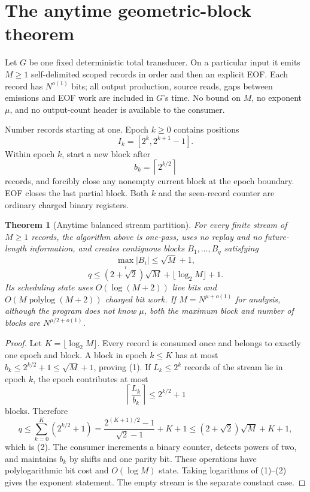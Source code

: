 \documentclass[11pt]{article}
\newtheorem{theorem}{Theorem}
\begin{document}
\section{The anytime geometric-block theorem}
Let $G$ be one fixed deterministic total transducer.  On a particular input it
emits $M\ge1$ self-delimited scoped records in order and then an explicit EOF.
Each record has $N^{o(1)}$ bits; all output production, source reads, gaps
between emissions and EOF work are included in $G$'s time.  No bound on $M$,
no exponent $\mu$, and no output-count header is available to the consumer.

Number records starting at one.  Epoch $k\ge0$ contains positions
\[
I_k=[2^k,2^{k+1}-1].
\]
Within epoch $k$, start a new block after
\[
b_k=\left\lceil2^{k/2}\right\rceil
\]
records, and forcibly close any nonempty current block at the epoch boundary.
EOF closes the last partial block.  Both $k$ and the seen-record counter are
ordinary charged binary registers.

\begin{theorem}[Anytime balanced stream partition]\label{th:anytime}
For every finite stream of $M\ge1$ records, the algorithm above is one-pass,
uses no replay and no future-length information, and creates contiguous blocks
$B_1,\ldots,B_q$ satisfying
\[
\boxed{\max_i|B_i|\le\sqrt M+1},                            \tag{1}
\]
\[
\boxed{q\le(2+\sqrt2)\sqrt M+\lfloor\log_2M\rfloor+1}.     \tag{2}
\]
Its scheduling state uses $O(\log(M+2))$ live bits and
$O(M\operatorname{polylog}(M+2))$ charged bit work.  If
$M=N^{\mu+o(1)}$ for analysis, although the program does not know $\mu$, both
the maximum block and number of blocks are $N^{\mu/2+o(1)}$.
\end{theorem}
\begin{proof}
Let $K=\lfloor\log_2M\rfloor$.  Every record is consumed once and belongs to
exactly one epoch and block.  A block in epoch $k\le K$ has at most
$b_k\le 2^{k/2}+1\le\sqrt M+1$, proving (1).  If $L_k\le2^k$ records of the
stream lie in epoch $k$, the epoch contributes at most
\[
\left\lceil\frac{L_k}{b_k}\right\rceil
\le 2^{k/2}+1
\]
blocks.  Therefore
\[
q\le\sum_{k=0}^{K}(2^{k/2}+1)
=\frac{2^{(K+1)/2}-1}{\sqrt2-1}+K+1
\le(2+\sqrt2)\sqrt M+K+1,
\]
which is (2).  The consumer increments a binary counter, detects powers of
two, and maintains $b_k$ by shifts and one parity bit.  These operations have
polylogarithmic bit cost and $O(\log M)$ state.  Taking logarithms of (1)--(2)
gives the exponent statement.  The empty stream is the separate constant case.
\end{proof}
\end{document}
